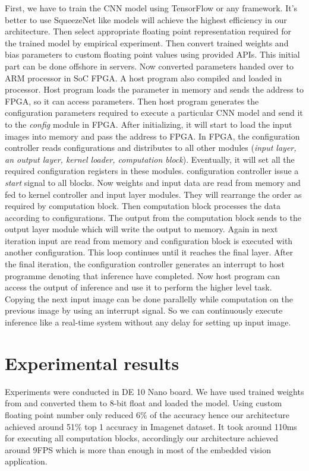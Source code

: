 \documentclass[conference]{IEEEtran}
\begin{document}
First, we have to train the CNN model using TensorFlow or any framework. It's better to use SqueezeNet like models will achieve the highest efficiency in our architecture. Then select appropriate floating point representation required for the trained model by empirical experiment. Then convert trained weights and bias parameters to custom floating point values using provided APIs. This initial part can be done offshore in servers. Now converted parameters handed over to ARM processor in SoC FPGA. A host program also compiled and loaded in processor. Host program loads the parameter in memory and sends the address to FPGA, so it can access parameters. Then host program generates the configuration parameters required to execute a particular CNN model and send it to the \textit{config} module in FPGA. After initializing, it will start to load the input images into memory and pass the address to FPGA. 
In FPGA, the configuration controller reads configurations and distributes to all other modules (\textit{input layer, an output layer, kernel loader, computation block}). Eventually, it will set all the required configuration registers in these modules. configuration controller issue a \textit{start} signal to all blocks. Now weights and input data are read from memory and fed to kernel controller and input layer modules. They will rearrange the order as required by computation block. Then computation block processes the data according to configurations. The output from the computation block sends to the output layer module which will write the output to memory. Again in next iteration input are read from memory and configuration block is executed with another configuration. This loop continues until it reaches the final layer. After the final iteration, the configuration controller generates an interrupt to host programme denoting that inference have completed. Now host program can access the output of inference and use it to perform the higher level task. Copying the next input image can be done parallelly while computation on the previous image by using an interrupt signal. So we can continuously execute inference like a real-time system without any delay for setting up input image.


\section{Experimental results}\label{SCM}


Experiments were conducted in DE 10 Nano board. We have used trained weights from \cite{weight} and converted them to 8-bit float and loaded the model. Using custom floating point number only reduced 6\% of the accuracy hence our architecture achieved around 51\% top 1 accuracy in Imagenet dataset. It took around 110ms for executing all computation blocks, accordingly our architecture achieved around 9FPS which is more than enough in most of the embedded vision application.
\end{document}
